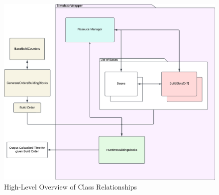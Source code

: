 \documentclass[a4paper, 12pt, english]{article}
\begin{document}
\begin{figure}[!ht]
    \begin{center}
        \includegraphics[width=150mm,scale=1.0]{HaloWarsDiagramHighLevelOverview.png}
    \end{center}
    \caption{\label{fig:HighLevelOverview}High-Level Overview of Class Relationships}
\end{figure}
\end{document}
